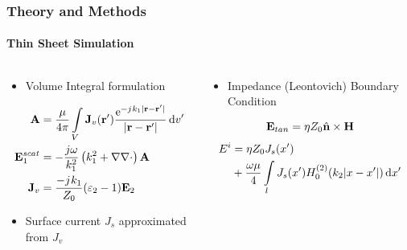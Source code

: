 \documentclass[mathserif,16pt,xcolor=table]{beamer}
\begin{document}
\begin{frame}
  \frametitle{Theory and Methods}
  \framesubtitle{Thin Sheet Simulation}
  \begin{columns}[T] %
    \begin{column}{.5\textwidth}
      \begin{itemize}
        \item{Volume Integral formulation}
      \end{itemize}
      \begin{equation} \nonumber
        \begin{split}
          \mathbf{A} &= \frac{\mu}{4 \pi} \int\limits_{V} \mathbf{J}_v(\mathbf{r}')  \frac{ \mathrm{e}^{-{j}\mkern1mu k_1 |\mathbf{r} - \mathbf{r}'|}}{|\mathbf{r} - \mathbf{r}'|} \mathop{}\!\mathrm{d}{v'} \\
          \mathbf{E}_1^{scat} &= -\frac{j \omega}{k_1^2} \left( k_1^2 + \nabla \nabla \cdot \right) \mathbf{A} \\
          \mathbf{J}_v &= \frac{-{j}\mkern1mu k_1}{Z_0}(\varepsilon_2 - 1)\mathbf{E}_2
        \end{split}
        \label{eq:E1sc}
      \end{equation}
      \begin{itemize}
        \item{Surface current $J_s$ approximated from $J_v$}
      \end{itemize}
    \end{column}
    \begin{column}[T]{.5\textwidth}
      \begin{itemize}
        \item{Impedance (Leontovich) Boundary Condition}
      \end{itemize}
      \begin{equation} \nonumber
        \mathbf{E}_{tan} = \eta Z_0 \hat{\mathbf{n}} \times \mathbf{H}
        \label{eq:eps}
      \end{equation}
      \begin{equation} \nonumber
        \begin{split}
          E^i &= \eta Z_0 J_s(x') \\
          & + \frac{\omega \mu}{4}  \int\limits_{l} J_s(x')  H_0^{(2)}(k_2 |x - x'|) \mathop{}\!\mathrm{d}{x'}
        \end{split}
        \label{eq:eps}
      \end{equation}
      \end{column}%
    \end{columns}
  \end{frame}
\end{document}
